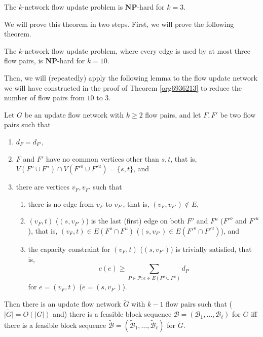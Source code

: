 \documentclass[fontsize=11pt,paper=a4]{book}
\begin{document}
\begin{thm}
The \(k\)-network flow update problem is \(\textbf{NP}\)-hard for \(k=3\).
\label{orge5402d0}
\end{thm}

We will prove this theorem in two steps.
First, we will prove the following theorem.

\begin{thm}
The \(k\)-network flow update problem, where every edge is used by at most three flow pairs, is \(\textbf{NP}\)-hard for \(k=10\).
\label{org6936213}
\end{thm}

Then, we will (repeatedly) apply the following lemma to the flow update network we will have constructed in the proof of Theorem \ref{org6936213} to reduce the number of flow pairs from \(10\) to \(3\).

\begin{lem}
Let \(G\) be an update flow network with \(k\geq 2\) flow pairs, and let \(F,F'\) be two flow pairs such that

\begin{enumerate}
\item \label{itm:lem-merging-flow-pairs-property-1}
\(d_F=d_{F'}\),

\item \label{itm:lem-merging-flow-pairs-property-2}
\(F\) and \(F'\) have no common vertices other than \(s,t\), that is, \(V(F^o\cup F^u)\cap V(F'^o\cup F'^u)=\{s,t\}\), and

\item \label{itm:lem-merging-flow-pairs-property-3}
there are vertices \(v_F,v_{F'}\) such that

\begin{enumerate}
\item \label{itm:lem-merging-flow-pairs-property-3-1}
there is no edge from \(v_F\) to \(v_{F'}\), that is, \((v_F,v_{F'})\notin E\),

\item \label{itm:lem-merging-flow-pairs-property-3-2}
\((v_F,t)\) (\((s,v_{F'})\)) is the last (first) edge on both \(F^o\) and \(F^u\) (\(F'^o\) and \(F'^u\)), that is, \((v_F,t)\in E(F^o\cap F^u)\) (\((s,v_{F'})\in E(F'^o\cap F'^u)\)), and

\item \label{itm:lem-merging-flow-pairs-property-3-3}
the capacity constraint for \((v_F,t)\) (\((s,v_{F'})\)) is trivially satisfied, that is,
\[
      c(e)\geq\sum_{P\in\mathcal{P}:e\in E(P^o\cup P^u)}d_P
      \]
for \(e=(v_F,t)\) (\(e=(s,v_{F'})\)).
\end{enumerate}
\end{enumerate}


Then there is an update flow network \(\tilde{G}\) with \(k-1\) flow pairs such that (\(\lvert\tilde{G}\rvert=O(\lvert G\rvert)\) and) there is a feasible block sequence \(\mathcal{B}=(\mathscr{B}_1,\dots,\mathscr{B}_{\ell})\) for \(G\) iff there is a feasible block sequence \(\tilde{\mathcal{B}}=(\tilde{\mathscr{B}}_1,\dots,\tilde{\mathscr{B}}_{\ell})\) for \(\tilde{G}\).
\label{orgf9b0f0c}
\end{lem}
\end{document}
